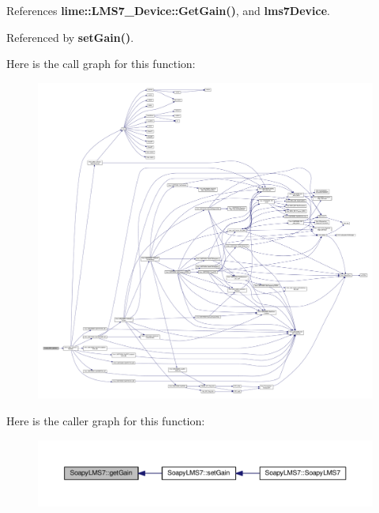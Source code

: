 References {\bf lime\+::\+L\+M\+S7\+\_\+\+Device\+::\+Get\+Gain()}, and {\bf lms7\+Device}.



Referenced by {\bf set\+Gain()}.



Here is the call graph for this function\+:
\nopagebreak
\begin{figure}[H]
\begin{center}
\leavevmode
\includegraphics[width=350pt]{d9/d90/classSoapyLMS7_ac32ddc0e99489455a4682d18c82eb802_cgraph}
\end{center}
\end{figure}




Here is the caller graph for this function\+:
\nopagebreak
\begin{figure}[H]
\begin{center}
\leavevmode
\includegraphics[width=350pt]{d9/d90/classSoapyLMS7_ac32ddc0e99489455a4682d18c82eb802_icgraph}
\end{center}
\end{figure}


